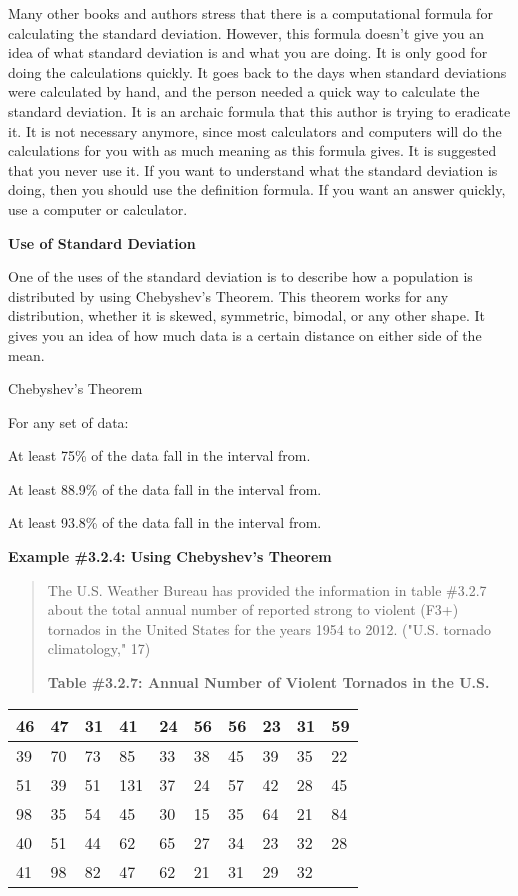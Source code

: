 \documentclass[]{book}
\begin{document}
Many other books and authors stress that there is a computational
formula for calculating the standard deviation. However, this formula
doesn't give you an idea of what standard deviation is and what you are
doing. It is only good for doing the calculations quickly. It goes back
to the days when standard deviations were calculated by hand, and the
person needed a quick way to calculate the standard deviation. It is an
archaic formula that this author is trying to eradicate it. It is not
necessary anymore, since most calculators and computers will do the
calculations for you with as much meaning as this formula gives. It is
suggested that you never use it. If you want to understand what the
standard deviation is doing, then you should use the definition formula.
If you want an answer quickly, use a computer or calculator.

\textbf{Use of Standard Deviation}

One of the uses of the standard deviation is to describe how a
population is distributed by using Chebyshev's Theorem. This theorem
works for any distribution, whether it is skewed, symmetric, bimodal, or
any other shape. It gives you an idea of how much data is a certain
distance on either side of the mean.

Chebyshev's Theorem

For {any} set of data:

At least 75\% of the data fall in the interval from.

At least 88.9\% of the data fall in the interval from.

At least 93.8\% of the data fall in the interval from.

\textbf{Example \#3.2.4: Using Chebyshev's Theorem}

\begin{quote}
The U.S. Weather Bureau has provided the information in table \#3.2.7
about the total annual number of reported strong to violent (F3+)
tornados in the United States for the years 1954 to 2012. ("U.S.
tornado climatology," 17)

\textbf{Table \#3.2.7: Annual Number of Violent Tornados in the U.S.}
\end{quote}

\begin{longtable}[]{@{}llllllllll@{}}
\toprule
46 & 47 & 31 & 41 & 24 & 56 & 56 & 23 & 31 & 59\tabularnewline
\midrule
\endhead
39 & 70 & 73 & 85 & 33 & 38 & 45 & 39 & 35 & 22\tabularnewline
51 & 39 & 51 & 131 & 37 & 24 & 57 & 42 & 28 & 45\tabularnewline
98 & 35 & 54 & 45 & 30 & 15 & 35 & 64 & 21 & 84\tabularnewline
40 & 51 & 44 & 62 & 65 & 27 & 34 & 23 & 32 & 28\tabularnewline
41 & 98 & 82 & 47 & 62 & 21 & 31 & 29 & 32 &\tabularnewline
\bottomrule
\end{longtable}
\end{document}
